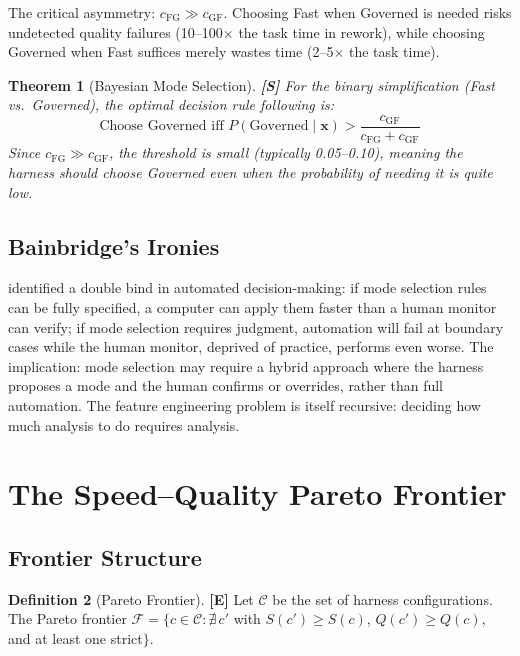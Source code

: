 \documentclass[11pt,a4paper]{article}
\newtheorem{theorem}{Theorem}[section]
\theoremstyle{definition}
\newtheorem{definition}[theorem]{Definition}
\theoremstyle{remark}
\begin{document}
The critical asymmetry: $c_{\mathrm{FG}} \gg c_{\mathrm{GF}}$. Choosing Fast when Governed is needed risks undetected quality failures (10--100$\times$ the task time in rework), while choosing Governed when Fast suffices merely wastes time (2--5$\times$ the task time).

\begin{theorem}[Bayesian Mode Selection]\label{thm:mode}
\textbf{[S]} For the binary simplification (Fast vs.\ Governed), the optimal decision rule following \citet{elkan2001foundations} is:
\[
    \text{Choose Governed iff } P(\text{Governed} \mid \mathbf{x}) > \frac{c_{\mathrm{GF}}}{c_{\mathrm{FG}} + c_{\mathrm{GF}}}
\]
Since $c_{\mathrm{FG}} \gg c_{\mathrm{GF}}$, the threshold is small (typically 0.05--0.10), meaning the harness should choose Governed even when the probability of needing it is quite low.
\end{theorem}

\subsection{Bainbridge's Ironies}

\citet{bainbridge1983ironies} identified a double bind in automated decision-making: if mode selection rules can be fully specified, a computer can apply them faster than a human monitor can verify; if mode selection requires judgment, automation will fail at boundary cases while the human monitor, deprived of practice, performs even worse. The implication: mode selection may require a hybrid approach where the harness proposes a mode and the human confirms or overrides, rather than full automation. The feature engineering problem is itself recursive: deciding how much analysis to do requires analysis.


\section{The Speed--Quality Pareto Frontier}\label{sec:pareto}

\subsection{Frontier Structure}

\begin{definition}[Pareto Frontier]\label{def:pareto}
\textbf{[E]} Let $\mathcal{C}$ be the set of harness configurations. The Pareto frontier $\mathcal{F} = \{c \in \mathcal{C} : \nexists\, c'$ with $S(c') \geq S(c)$, $Q(c') \geq Q(c)$, and at least one strict$\}$.
\end{definition}
\end{document}

